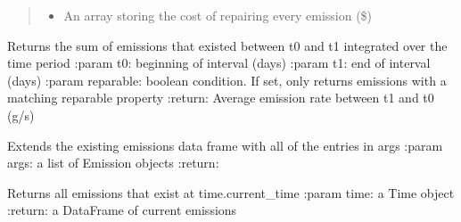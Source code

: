 \documentclass[letterpaper,10pt,english]{sphinxmanual}
\begin{document}
\begin{fulllineitems}
\begin{quote}
\begin{description}
\begin{itemize}
\item {} 
 \textendash{} An array storing the cost of repairing every emission (\$)

\end{itemize}

\end{description}\end{quote}

\begin{fulllineitems}
\label{\detokenize{index:feast.EmissionSimModules.emission_class_functions.Emission.em_rate_in_range}}
Returns the sum of emissions that existed between t0 and t1 integrated over the time period
:param t0: beginning of interval (days)
:param t1: end of interval (days)
:param reparable: boolean condition. If set, only returns emissions with a matching reparable property
:return: Average emission rate between t1 and t0 (g/s)

\end{fulllineitems}


\begin{fulllineitems}
\label{\detokenize{index:feast.EmissionSimModules.emission_class_functions.Emission.extend}}
Extends the existing emissions data frame with all of the entries in args
:param args: a list of Emission objects
:return:

\end{fulllineitems}


\begin{fulllineitems}
\label{\detokenize{index:feast.EmissionSimModules.emission_class_functions.Emission.get_current_emissions}}
Returns all emissions that exist at time.current\_time
:param time: a Time object
:return: a DataFrame of current emissions

\end{fulllineitems}


\end{fulllineitems}
\end{document}
